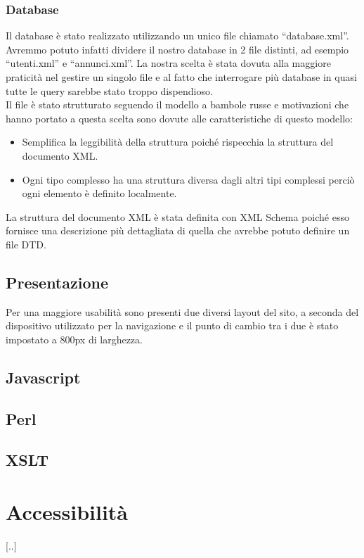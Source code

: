 \documentclass[12pt]{article}
\begin{document}
	
		\subsubsection{Database}
		Il database è stato realizzato utilizzando un unico file chiamato “database.xml”.
		Avremmo potuto infatti dividere il nostro database in 2 file distinti, ad esempio “utenti.xml” e “annunci.xml”.
		La nostra scelta è stata dovuta alla maggiore praticità nel gestire un singolo file e al fatto che interrogare più database in quasi tutte le query sarebbe stato troppo dispendioso.\\
		Il file è stato strutturato seguendo il modello a bambole russe e motivazioni che hanno portato a questa scelta sono dovute alle caratteristiche di questo modello:
		
		\begin{itemize}
			\item Semplifica la leggibilità della struttura poiché rispecchia la struttura del documento XML.
			\item Ogni tipo complesso ha una struttura diversa dagli altri tipi complessi perciò ogni elemento è definito localmente.
		\end{itemize}
		
		La struttura del documento XML è stata definita con XML Schema poiché esso fornisce una descrizione più dettagliata di quella che avrebbe potuto definire un file DTD.

	\subsection{Presentazione}
	
	Per una maggiore usabilità sono presenti due diversi layout del sito, a seconda del dispositivo utilizzato per la navigazione e il punto di cambio tra i due è stato impostato a 800px di larghezza.
	
	\subsection{Javascript}
	\subsection{Perl}
	\subsection{XSLT}


\section{Accessibilità}
[..]
\end{document}
